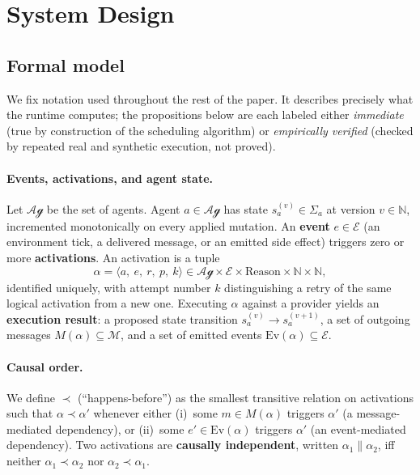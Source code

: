 \section{System Design}
\label{sec:design}

\subsection{Formal model}
\label{sec:formal-model}

We fix notation used throughout the rest of the paper. It describes precisely what the runtime computes; the propositions below are each labeled either \emph{immediate} (true by construction of the scheduling algorithm) or \emph{empirically verified} (checked by repeated real and synthetic execution, not proved).

\paragraph{Events, activations, and agent state.}
Let $\mathcal{Ag}$ be the set of agents. Agent $a \in \mathcal{Ag}$ has state $s_a^{(v)} \in \Sigma_a$ at version $v \in \mathbb{N}$, incremented monotonically on every applied mutation. An \textbf{event} $e \in \mathcal{E}$ (an environment tick, a delivered message, or an emitted side effect) triggers zero or more \textbf{activations}. An activation is a tuple
\[
\alpha = \langle a,\ e,\ r,\ p,\ k \rangle \in \mathcal{Ag} \times \mathcal{E} \times \mathrm{Reason} \times \mathbb{N} \times \mathbb{N},
\]
identified uniquely, with attempt number $k$ distinguishing a retry of the same logical activation from a new one. Executing $\alpha$ against a provider yields an \textbf{execution result}: a proposed state transition $s_a^{(v)} \to s_a^{(v+1)}$, a set of outgoing messages $M(\alpha) \subseteq \mathcal{M}$, and a set of emitted events $\mathrm{Ev}(\alpha) \subseteq \mathcal{E}$.

\paragraph{Causal order.}
We define $\prec$ (``happens-before'') as the smallest transitive relation on activations such that $\alpha \prec \alpha'$ whenever either (i)~some $m \in M(\alpha)$ triggers $\alpha'$ (a message-mediated dependency), or (ii)~some $e' \in \mathrm{Ev}(\alpha)$ triggers $\alpha'$ (an event-mediated dependency). Two activations are \textbf{causally independent}, written $\alpha_1 \parallel \alpha_2$, iff neither $\alpha_1 \prec \alpha_2$ nor $\alpha_2 \prec \alpha_1$.

